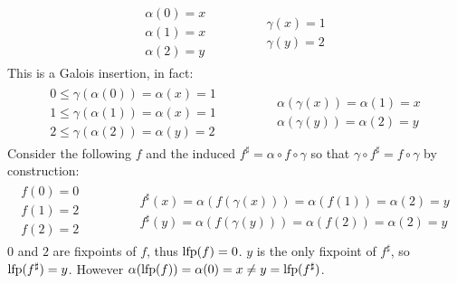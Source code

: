 \begin{exercise}
\begin{enumerate}[1.]
        \begin{gather*}
            \begin{aligned}
                \alpha(0) = x \\
                \alpha(1) = x \\
                \alpha(2) = y
            \end{aligned}
            \qquad\qquad
            \begin{aligned}
                \gamma(x) = 1 \\
                \gamma(y) = 2
            \end{aligned}
        \end{gather*}
        This is a Galois insertion, in fact:
        \begin{gather*}
            \begin{aligned}
                0 \leq \gamma(\alpha(0)) = \alpha(x) = 1 \\
                1 \leq \gamma(\alpha(1)) = \alpha(x) = 1 \\
                2 \leq \gamma(\alpha(2)) = \alpha(y) = 2
            \end{aligned}
            \qquad\qquad
            \begin{aligned}
                \alpha(\gamma(x)) = \alpha(1) = x \\
                \alpha(\gamma(y)) = \alpha(2) = y
            \end{aligned}
        \end{gather*}
        Consider the following $f$ and the induced $f^\sharp = \alpha \circ f \circ \gamma$ so that $\gamma \circ f^\sharp = f \circ \gamma$ by construction:
        \begin{gather*}
            \begin{aligned}
                f(0) = 0 \\
                f(1) = 2 \\
                f(2) = 2
            \end{aligned}
            \qquad\qquad
            \begin{aligned}
                f^\sharp (x) = \alpha(f(\gamma(x))) = \alpha(f(1)) = \alpha(2) = y \\
                f^\sharp (y) = \alpha(f(\gamma(y))) = \alpha(f(2)) = \alpha(2) = y
            \end{aligned}
        \end{gather*}
        $0$ and $2$ are fixpoints of $f$, thus $\operatorname{lfp}(f) = 0$. $y$ is the only fixpoint of $f^\sharp$, so $\operatorname{lfp}(f^\sharp) = y$. However $\alpha(\operatorname{lfp}(f)) = \alpha(0) = x \neq y = \operatorname{lfp}(f^\sharp)$.
    \end{enumerate}
\end{exercise}
